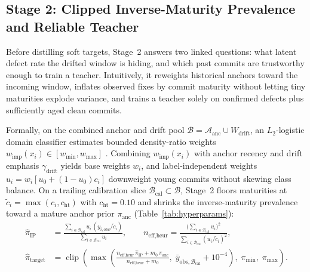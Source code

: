 \documentclass[pdflatex,sn-basic]{sn-jnl}
\theoremstyle{definition}
\theoremstyle{plain}
\begin{document}
\subsection{Stage 2: Clipped Inverse-Maturity Prevalence and Reliable Teacher}
\label{sec:stage2}

Before distilling soft targets, Stage~2 answers two linked questions: what latent defect rate the drifted window is hiding, and which past commits are trustworthy enough to train a teacher. Intuitively, it reweights historical anchors toward the incoming window, inflates observed fixes by commit maturity without letting tiny maturities explode variance, and trains a teacher solely on confirmed defects plus sufficiently aged clean commits.

Formally, on the combined anchor and drift pool $\mathcal{B} = \mathcal{A}_{\text{anc}} \cup W_{\text{drift}}$, an $L_2$-logistic domain classifier estimates bounded density-ratio weights $w_{\text{imp}}(x_i) \in [w_{\min}, w_{\max}]$ \citep{sugiyama2008direct}. Combining $w_{\text{imp}}(x_i)$ with anchor recency and drift emphasis $\gamma_{\text{drift}}$ yields base weights $w_i$, and label-independent weights $u_i = w_i[u_0 + (1 - u_0)c_i]$ downweight young commits without skewing class balance. On a trailing calibration slice $\mathcal{B}_{\text{cal}} \subset \mathcal{B}$, Stage~2 floors maturities at $\tilde{c}_i = \max(c_i, c_{\text{ht}})$ with $c_{\text{ht}} = 0.10$ and shrinks the inverse-maturity prevalence toward a mature anchor prior $\pi_{\text{anc}}$ (Table~\ref{tab:hyperparams}):
\begin{equation}
  \begin{aligned}
    \hat{\pi}_{\text{IP}} &= \frac{\sum_{i \in \mathcal{B}_{\text{cal}}} u_i\,(y_{i,\text{obs}} / \tilde{c}_i)}{\sum_{i \in \mathcal{B}_{\text{cal}}} u_i}, \qquad n_{\text{eff,heur}} = \frac{\big(\sum_{i \in \mathcal{B}_{\text{cal}}} u_i\big)^2}{\sum_{i \in \mathcal{B}_{\text{cal}}} (u_i / \tilde{c}_i)^2}, \\
    \hat{\pi}_{\text{target}} &= \operatorname{clip}\!\left(\max\!\left(\frac{n_{\text{eff,heur}}\,\hat{\pi}_{\text{IP}} + m_0\,\pi_{\text{anc}}}{n_{\text{eff,heur}} + m_0},\; \bar{y}_{\text{obs},\mathcal{B}_{\text{cal}}} + 10^{-4}\right),\; \pi_{\min},\; \pi_{\max}\right).
  \end{aligned}
  \label{eq:ht_prev}
\end{equation}
\end{document}
